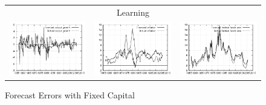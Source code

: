 \documentclass{beamer}
\begin{document}
\frame
{
\begin{figure}[ht]
\caption{Forecast Errors with Fixed Capital}\label{fg:fe_nok}
\begin{center}
\begin{tabular}{ccc}
\multicolumn{3}{c}{Learning} \\
\includegraphics[scale=0.2]{plots/nok_gh_fe_y.png} & \includegraphics[scale=0.2]{plots/nok_gh_fe_pi.png} & \includegraphics[scale=0.2]{plots/nok_gh_fe_r.png} \\

\end{tabular}
\end{center}
\end{figure}}
\end{document}
